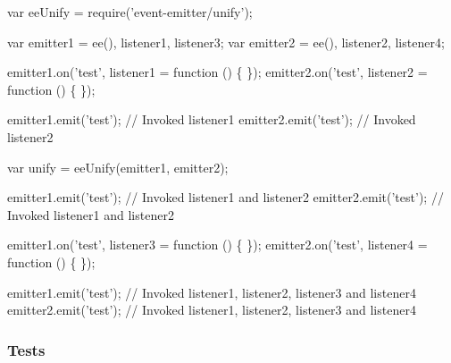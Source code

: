 \begin{DoxyCode}
var eeUnify = require('event-emitter/unify');

var emitter1 = ee(), listener1, listener3;
var emitter2 = ee(), listener2, listener4;

emitter1.on('test', listener1 = function () \{ \});
emitter2.on('test', listener2 = function () \{ \});

emitter1.emit('test'); // Invoked listener1
emitter2.emit('test'); // Invoked listener2

var unify = eeUnify(emitter1, emitter2);

emitter1.emit('test'); // Invoked listener1 and listener2
emitter2.emit('test'); // Invoked listener1 and listener2

emitter1.on('test', listener3 = function () \{ \});
emitter2.on('test', listener4 = function () \{ \});

emitter1.emit('test'); // Invoked listener1, listener2, listener3 and listener4
emitter2.emit('test'); // Invoked listener1, listener2, listener3 and listener4
\end{DoxyCode}


\subsubsection*{Tests \href{https://travis-ci.org/medikoo/event-emitter}{\tt }}

 